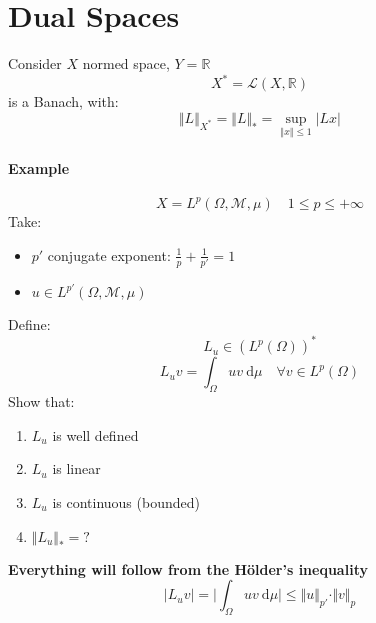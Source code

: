 \section{Dual Spaces}

Consider $X$ normed space, $Y=\mathbb R$
$$X^*=\mathcal L(X,\mathbb R)$$
is a Banach, with:
$$\Vert L\Vert _{X^*}=\Vert L\Vert_*=\sup_{\Vert x\Vert \leq 1}|Lx|$$
\paragraph{Example}
$$X=L^p(\Omega,\mathcal M,\mu)\quad 1\leq p\leq +\infty$$
Take:
\begin{itemize}
    \item $p'$ conjugate exponent: $\frac 1p+\frac 1{p'}=1$
    \item $u\in L^{p'}(\Omega, \mathcal M,\mu)$
\end{itemize}
Define:
$$L_u\in (L^p(\Omega))^*$$
$$L_uv=\int_\Omega uv\ \mathrm d\mu\quad \forall v\in L^p(\Omega)$$
Show that:
\begin{enumerate}
    \item $L_u$ is well defined
    \item $L_u$ is linear
    \item $L_u$ is continuous (bounded)
    \item $\Vert L_u\Vert _*=?$
\end{enumerate}
\textbf{Everything will follow from the Hölder's inequality} $$|L_uv|=\Big|\int_\Omega uv\ \mathrm d\mu \Big|\leq \Vert u\Vert_{p'} \cdot \Vert v\Vert_p $$
